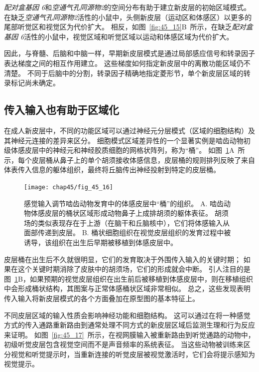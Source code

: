 \textit{配对盒基因 6}和\textit{空通气孔同源物2}的空间分布有助于建立新皮层的初始区域模式。
在缺乏\textit{空通气孔同源物2}活性的小鼠中，头侧新皮层（运动区和体感区）以更多的尾部听觉区和视觉区为代价扩大。
相反，如图~\ref{fig:45_15}B~所示，在缺乏\textit{配对盒基因 6}活性的小鼠中，视觉区域和听觉区域以运动和体感区域为代价扩大。


因此，与脊髓、后脑和中脑一样，早期新皮层模式是通过局部感应信号和转录因子表达梯度之间的相互作用建立。
这些梯度如何指定新皮层中的离散功能区域仍不清楚。
不同于后脑中的分割，转录因子精确地指定菱形节，单个新皮层区域的转录标记尚未确定。



\subsection{传入输入也有助于区域化}

在成人新皮层中，不同的功能区域可以通过神经元分层模式（区域的细胞结构）及其神经元连接的差异来区分。
细胞模式区域差异性的一个显著实例是啮齿动物初级体感皮层中的神经元和神经胶质细胞的网格状阵列，称为“桶”。
如图~\ref{fig:45_16}A~所示，每个皮层桶从鼻子上的单个胡须接收体感信息，皮层桶的规则排列反映了来自体表传入信息的躯体组织，最终将丘脑传出神经投射到特定的皮层桶。


\begin{figure}[htbp]
	\centering
	\texttt{[image: chap45/fig\_45\_16]}
	\caption{感觉输入调节啮齿动物发育中的体感皮层中“桶”的组织\cite{schlaggar1991potential}。
		A. 啮齿动物体感皮层的桶状区域形成动物鼻子上成排胡须的躯体表征。
		胡须场的类似表现存在于上游（在脑干和丘脑核中），它们将体感输入从面部传递到皮层。
		B. 桶状细胞组织在视觉皮层组织的发育过程中被诱导，该组织在出生后早期被移植到体感皮层中。}
	\label{fig:45_16}
\end{figure}


皮层桶在出生后不久就很明显，它们的发育取决于外围传入输入的关键时期；
如果在这个关键时期消除了皮肤中的胡须场，它们的形成就会中断。
引人注目的是图~\ref{fig:45_16}B，如果预期的视觉皮层组织在出生前后被移植到体感皮层中，则在移植组织中会形成桶状结构，其图案与正常体感桶状区域非常相似。
总之，这些发现表明传入输入将新皮层模式的各个方面叠加在原型图的基本特征上。


不同皮层区域的输入性质会影响神经功能和细胞结构。
这可以通过在将一种感觉方式的传入通路重新路由到通常处理不同方式的新皮层区域后监测生理和行为反应来证明。
如图~\ref{fig:45_17}~所示，在视网膜输入被重新路由到听觉通路的动物中，初级听觉皮层包含视觉空间而不是声音频率的系统表征。
当这些动物被训练来区分视觉和听觉提示时，当重新连接的听觉皮层被视觉激活时，它们会将提示感知为视觉提示。


